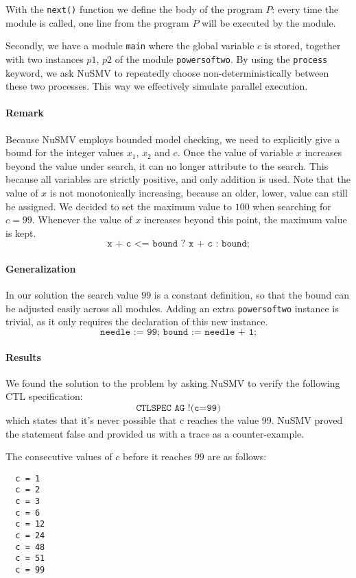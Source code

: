 \documentclass[12pt]{article}
\begin{document}
With the \texttt{next()} function we define the body of the program $P$: every time the module is called, one line from the program $P$ will be executed by the module.

Secondly, we have a module \texttt{main} where
the global variable $c$ is stored, 
together with two instances $p1$, $p2$ of the module \texttt{powersoftwo}.
By using the \texttt{process} keyword, 
we ask NuSMV to repeatedly choose non-deterministically 
between these two processes. 
This way we effectively simulate parallel execution.

\paragraph{Remark}
Because NuSMV employs bounded model checking, we need to explicitly give a bound for the integer values $x_1$, $x_2$ and $c$.
Once the value of variable $x$ increases beyond the value under search, it can no longer attribute to the search.
This because all variables are strictly positive, and only addition is used.
Note that the value of $x$ is not monotonically increasing, because an older, lower, value can still be assigned.
We decided to set the maximum value to $100$ when searching for $c = 99$.
Whenever the value of $x$ increases beyond this point, the maximum value is kept.
\[\texttt{x + c <= bound ? x + c : bound;}\]

\paragraph{Generalization}
In our solution the search value $99$ is a constant definition, so that the bound can be adjusted easily across all modules.
Adding an extra \texttt{powersoftwo} instance is trivial, as it only requires the declaration of this new instance.
\[\texttt{needle := 99; bound := needle + 1;}\]

\paragraph{Results}
We found the solution to the problem by asking NuSMV 
to verify the following CTL specification:
\[\texttt{CTLSPEC AG !(c=99)}\]
which states that it's never possible that c reaches the value 99.
NuSMV proved the statement false and 
provided us with a trace as a counter-example.

The consecutive values of $c$ before it reaches $99$ are as follows:
\begin{verbatim}
  c = 1
  c = 2
  c = 3
  c = 6
  c = 12
  c = 24
  c = 48
  c = 51
  c = 99
\end{verbatim}
\end{document}
